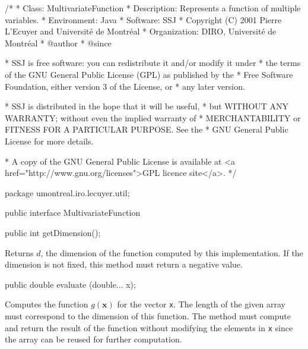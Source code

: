 \begin{code}\begin{hide}
/*
 * Class:        MultivariateFunction
 * Description:  Represents a function of multiple variables.
 * Environment:  Java
 * Software:     SSJ 
 * Copyright (C) 2001  Pierre L'Ecuyer and Université de Montréal
 * Organization: DIRO, Université de Montréal
 * @author       
 * @since

 * SSJ is free software: you can redistribute it and/or modify it under
 * the terms of the GNU General Public License (GPL) as published by the
 * Free Software Foundation, either version 3 of the License, or
 * any later version.

 * SSJ is distributed in the hope that it will be useful,
 * but WITHOUT ANY WARRANTY; without even the implied warranty of
 * MERCHANTABILITY or FITNESS FOR A PARTICULAR PURPOSE.  See the
 * GNU General Public License for more details.

 * A copy of the GNU General Public License is available at
   <a href="http://www.gnu.org/licenses">GPL licence site</a>.
 */
\end{hide}
package umontreal.iro.lecuyer.util;


public interface MultivariateFunction\begin{hide} {\end{hide}

   public int getDimension();
\end{code}
\begin{tabb} Returns $d$, the dimension of the function computed
   by this implementation.  If the dimension is not fixed,
   this method must return a negative value.
\end{tabb}
\begin{htmlonly}
\end{htmlonly}
\begin{code}

   public double evaluate (double... x);
\end{code}
\begin{tabb}   Computes the function $g(\mathbf{x})$
 for the vector \texttt{x}.  The length of the
 given array must correspond to the dimension of
 this function.  The method must compute and return the result
 of the function without modifying the elements
 in \texttt{x} since the array can be reused for
 further computation.
\end{tabb}
\begin{htmlonly}
\end{htmlonly}
